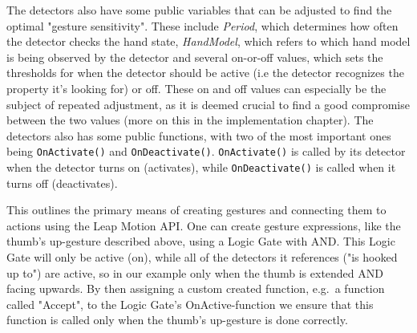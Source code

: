The detectors also have some public variables that can be adjusted to find the optimal "gesture sensitivity". These include \textit{Period}, which determines how often 
the detector checks the hand state,
\textit{HandModel}, which refers to which hand model is being observed by the detector and several on-or-off values, 
which sets the thresholds for when the detector should be active (i.e the detector recognizes the property it's looking for) or off. 
These on and off values can especially be the subject of repeated adjustment, as it is deemed crucial to find a good
compromise between the two values (more on this in the implementation chapter). The detectors also has some public functions, with two of the most important ones being
\texttt{OnActivate()} and \texttt{OnDeactivate()}. \texttt{OnActivate()} is called by its detector when the detector turns on (activates), 
while \texttt{OnDeactivate()} is called when it turns off (deactivates). 

This outlines the primary means of creating gestures and connecting them to actions using the Leap Motion API. One can create gesture expressions, like the thumb's up-gesture
described above, using a Logic Gate with AND. This Logic Gate will only be active (on), while all of the detectors it references ("is hooked up to") are active, so in our example
only when the thumb is extended AND facing upwards. By then assigning a custom created function, e.g.~a function called "Accept", to the Logic Gate's OnActive-function we
ensure that this function is called only when the thumb's up-gesture is done correctly. 










